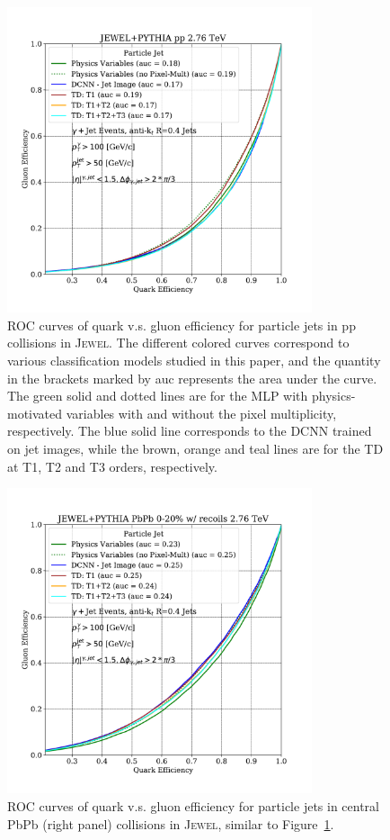 \documentclass[notoc]{JHEP3}
\begin{document}
\begin{figure}[h]
	\centering
	\includegraphics[width=0.8\textwidth]{plots/JEWELPYTHIA_pp_2p76TeV_genLevel_QvsG.pdf}
	\caption{ROC curves of quark v.s. gluon efficiency for particle jets in pp collisions in \textsc{Jewel}. The different colored curves correspond to various classification models studied in this paper, and the quantity in the brackets marked by auc represents the area under the curve. The green solid and dotted lines are for the MLP with physics-motivated variables with and without the pixel multiplicity, respectively. The blue solid line corresponds to the DCNN trained on jet images, while the brown, orange and teal lines are for the TD at T1, T2 and T3 orders, respectively.}
\label{fig:ROC_pp}
\end{figure}

\begin{figure}[h]
	\centering
	\includegraphics[width=0.8\textwidth]{plots/JEWELPYTHIA_PbPb_2p76TeV_genLevel_QvsG.pdf}
	\caption{ROC curves of quark v.s. gluon efficiency for particle jets in central PbPb (right panel) collisions in \textsc{Jewel}, similar to Figure~\ref{fig:ROC_pp}.}
\label{fig:ROC_pbpb}
\end{figure}
\end{document}
